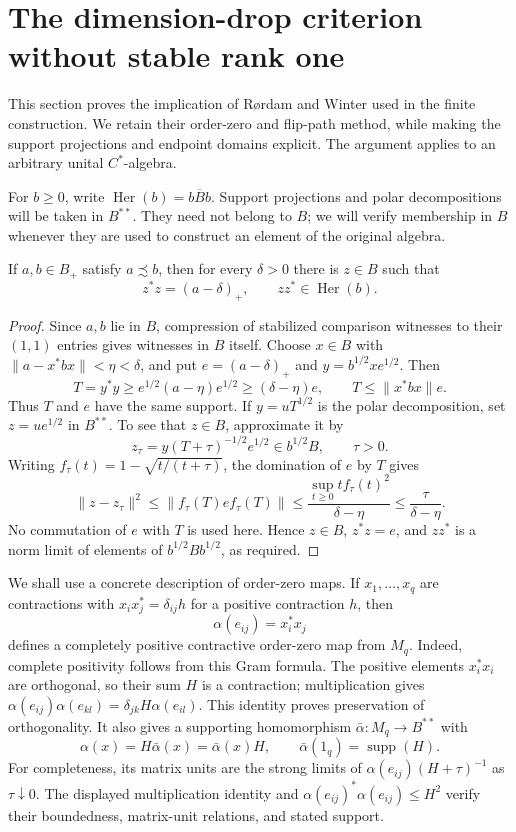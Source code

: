 \section{The dimension-drop criterion without stable rank one}
\label{sec:rw}

This section proves the implication of R\o rdam and Winter
\cite[Proposition~5.1, (ii)$\Rightarrow$(iv)]{RW} used in the finite
construction. We retain their order-zero and flip-path method, while
making the support projections and endpoint domains explicit. The
argument applies to an arbitrary unital $C^*$-algebra.

For $b\ge0$, write $\operatorname{Her}(b)=\overline{bBb}$.
Support projections and polar decompositions will be taken in $B^{**}$.
They need not belong to $B$; we will verify membership in $B$ whenever
they are used to construct an element of the original algebra.

\begin{lemma}\label{lem:rw-exact-cut}
If $a,b\in B_+$ satisfy $a\precsim b$, then for every $\delta>0$
there is $z\in B$ such that
\[
 z^*z=(a-\delta)_+,
 \qquad zz^*\in\operatorname{Her}(b).
\]
\end{lemma}
\begin{proof}
Since $a,b$ lie in $B$, compression of stabilized comparison
witnesses to their $(1,1)$ entries gives witnesses in $B$ itself.
Choose $x\in B$ with $\|a-x^*bx\|<\eta<\delta$, and put
$e=(a-\delta)_+$ and $y=b^{1/2}xe^{1/2}$. Then
\[
 T=y^*y\ge e^{1/2}(a-\eta)e^{1/2}
       \ge(\delta-\eta)e,
 \qquad T\le\|x^*bx\|e.
\]
Thus $T$ and $e$ have the same support. If $y=uT^{1/2}$ is the polar
decomposition, set $z=ue^{1/2}$ in $B^{**}$. To see that $z\in B$,
approximate it by
\[
 z_\tau=y(T+\tau)^{-1/2}e^{1/2}\in b^{1/2}B,
 \qquad \tau>0.
\]
Writing $f_\tau(t)=1-\sqrt{t/(t+\tau)}$, the domination of $e$ by
$T$ gives
\[
 \|z-z_\tau\|^2
 \le\|f_\tau(T)e f_\tau(T)\|
 \le\frac{\sup_{t\ge0}t f_\tau(t)^2}{\delta-\eta}
 \le\frac{\tau}{\delta-\eta}.
\]
No commutation of $e$ with $T$ is used here. Hence $z\in B$,
$z^*z=e$, and $zz^*$ is a norm limit of elements of
$b^{1/2}Bb^{1/2}$, as required.
\end{proof}

We shall use a concrete description of order-zero maps. If
$x_1,\ldots,x_q$ are contractions with
$x_i x_j^*=\delta_{ij}h$ for a positive contraction $h$, then
\[
 \alpha(e_{ij})=x_i^*x_j
\]
defines a completely positive contractive order-zero map from $M_q$.
Indeed, complete positivity follows from this Gram formula. The
positive elements $x_i^*x_i$ are orthogonal, so their sum $H$ is a
contraction; multiplication gives
$\alpha(e_{ij})\alpha(e_{kl})=\delta_{jk}H\alpha(e_{il})$.
This identity proves preservation of orthogonality. It also gives a
supporting homomorphism $\bar\alpha:M_q\to B^{**}$ with
\[
 \alpha(x)=H\bar\alpha(x)=\bar\alpha(x)H,
 \qquad \bar\alpha(1_q)=\operatorname{supp}(H).
\]
For completeness, its matrix units are the strong limits of
$\alpha(e_{ij})(H+\tau)^{-1}$ as $\tau\downarrow0$. The displayed
multiplication identity and
$\alpha(e_{ij})^*\alpha(e_{ij})\le H^2$ verify their boundedness,
matrix-unit relations, and stated support.

